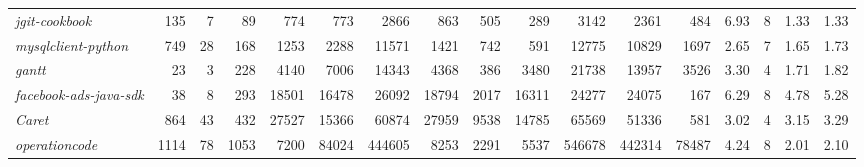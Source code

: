 \begin{table*}[h]
{\begin{tabular}{@{}lrrrrrrrrrrrrrrrr@{}}
		\textit{jgit-cookbook}               & 135       & 7       & 89        & 774          & 773                  & 2866               & 863                  & 505                        & 289                          & 3142                 & 2361                    & 484                       & 6.93             & 8                & 1.33                    & 1.33                \\
		\textit{mysqlclient-python}          & 749       & 28      & 168       & 1253         & 2288                 & 11571              & 1421                 & 742                        & 591                          & 12775                & 10829                   & 1697                      & 2.65             & 7                & 1.65                    & 1.73                \\
		\textit{gantt}                       & 23        & 3       & 228       & 4140         & 7006                 & 14343              & 4368                 & 386                        & 3480                         & 21738                & 13957                   & 3526                      & 3.30             & 4                & 1.71                    & 1.82                \\
		\textit{facebook-ads-java-sdk}       & 38        & 8       & 293       & 18501        & 16478                & 26092              & 18794                & 2017                       & 16311                        & 24277                & 24075                   & 167                       & 6.29             & 8                & 4.78                    & 5.28                \\
		\textit{Caret}                       & 864       & 43      & 432       & 27527        & 15366                & 60874              & 27959                & 9538                       & 14785                        & 65569                & 51336                   & 581                       & 3.02             & 4                & 3.15                    & 3.29                \\
		\textit{operationcode}               & 1114      & 78      & 1053      & 7200         & 84024                & 444605             & 8253                 & 2291                       & 5537                         & 546678               & 442314                  & 78487                     & 4.24             & 8                & 2.01                    & 2.10                \\ \bottomrule
		\end{tabular}%
	}

\end{table*}